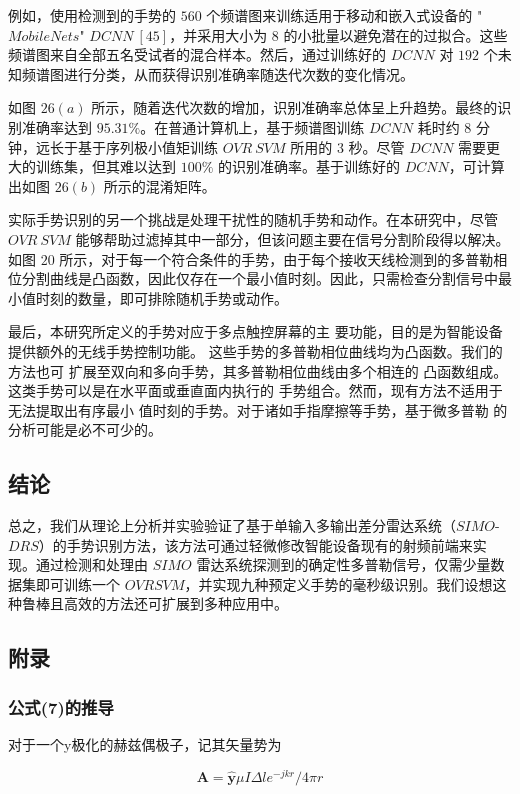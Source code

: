 \begin{TranslationNoMiniToc}
例如，使用检测到的手势的 $560$ 个频谱图来训练适用于移动和嵌入式设备的 "$MobileNets$" $DCNN \ [45]$，并采用大小为 $8$ 的小批量以避免潜在的过拟合。这些频谱图来自全部五名受试者的混合样本。然后，通过训练好的 $DCNN$ 对 $192$ 个未知频谱图进行分类，从而获得识别准确率随迭代次数的变化情况。

如图 $26(a)$ 所示，随着迭代次数的增加，识别准确率总体呈上升趋势。最终的识别准确率达到 $95.31\%$。在普通计算机上，基于频谱图训练 $DCNN$ 耗时约 $8$ 分钟，远长于基于序列极小值矩训练 $OVR \ SVM$ 所用的 $3$ 秒。尽管 $DCNN$ 需要更大的训练集，但其难以达到 $100\%$ 的识别准确率。基于训练好的 $DCNN$，可计算出如图 $26(b)$ 所示的混淆矩阵。

实际手势识别的另一个挑战是处理干扰性的随机手势和动作。在本研究中，尽管 $OVR \ SVM$ 能够帮助过滤掉其中一部分，但该问题主要在信号分割阶段得以解决。如图 $20$ 所示，对于每一个符合条件的手势，由于每个接收天线检测到的多普勒相位分割曲线是凸函数，因此仅存在一个最小值时刻。因此，只需检查分割信号中最小值时刻的数量，即可排除随机手势或动作。

最后，本研究所定义的手势对应于多点触控屏幕的主
要功能，目的是为智能设备提供额外的无线手势控制功能。
这些手势的多普勒相位曲线均为凸函数。我们的方法也可
扩展至双向和多向手势，其多普勒相位曲线由多个相连的
凸函数组成。这类手势可以是在水平面或垂直面内执行的
手势组合。然而，现有方法不适用于无法提取出有序最小
值时刻的手势。对于诸如手指摩擦等手势，基于微多普勒
的分析可能是必不可少的。

\subsection{结论}
总之，我们从理论上分析并实验验证了基于单输入多输出差分雷达系统（$SIMO$-$DRS$）的手势识别方法，该方法可通过轻微修改智能设备现有的射频前端来实现。通过检测和处理由 $SIMO$ 雷达系统探测到的确定性多普勒信号，仅需少量数据集即可训练一个 $OVRSVM$，并实现九种预定义手势的毫秒级识别。我们设想这种鲁棒且高效的方法还可扩展到多种应用中。

\subsection{附录}
\subsubsection{公式(7)的推导}
对于一个y极化的赫兹偶极子，记其矢量势为

\begin{equation}
\boldsymbol{A} = \boldsymbol{\hat{y}} \mu I \Delta l e^{-jkr} / 4 \pi r
\end{equation}


\end{TranslationNoMiniToc}
